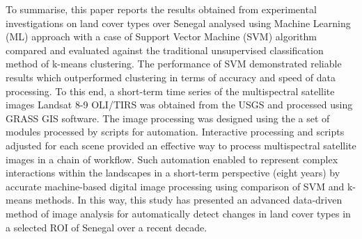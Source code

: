 \documentclass[earth,article,submit,pdftex,moreauthors]{Definitions/mdpi}
\begin{document}
To summarise, this paper reports the results obtained from experimental investigations on land cover types over Senegal analysed using {Machine Learning (ML) approach with a case of Support Vector Machine (SVM) algorithm compared and evaluated against the traditional unsupervised classification method of k-means clustering. The performance of SVM demonstrated reliable results which outperformed clustering in terms of accuracy and speed of data processing. To this end, }a short-term time series of the multispectral satellite images Landsat 8-9 OLI/TIRS {was }obtained from the USGS {and processed using GRASS GIS software}. The image processing was designed using the {a set of modules processed by scripts for automation. }Interactive processing and scripts adjusted for each scene provided an effective way to process multispectral satellite images {in a chain of workflow}. Such automation enabled to represent complex interactions within the landscapes in a short-term perspective (eight years) by accurate machine-based digital image processing {using comparison of SVM and k-means methods}. In this way, this study has presented an advanced data-driven method of image analysis for automatically detect changes in land cover types in a selected ROI of Senegal over a recent decade.






\end{document}
